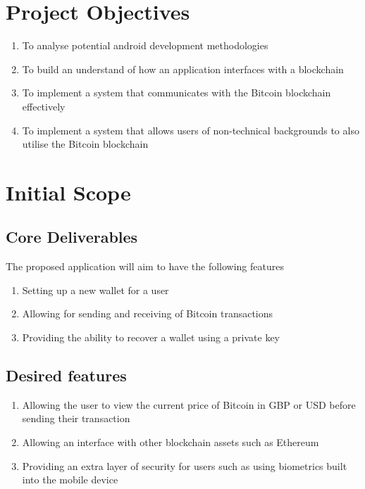 \documentclass[11pt]{article}
\begin{document}
\section{Project Objectives}
\label{sec:orgdfc5f8e}
\begin{enumerate}
\item To analyse potential android development methodologies
\label{sec:org39cbb94}
\item To build an understand of how an application interfaces with a blockchain
\label{sec:orgda3857f}
\item To implement a system that communicates with the Bitcoin blockchain effectively
\label{sec:org17774ea}
\item To implement a system that allows users of non-technical backgrounds to also utilise the Bitcoin blockchain
\label{sec:org1acc9ed}
\end{enumerate}


\section{Initial Scope}
\label{sec:orgf0603ac}
\subsection{Core Deliverables}
\label{sec:org2fd96fb}
The proposed application will aim to have the following features
\begin{enumerate}
\item Setting up a new wallet for a user
\label{sec:orgb4e5ea8}
\item Allowing for sending and receiving of Bitcoin transactions
\label{sec:org7543029}
\item Providing the ability to recover a wallet using a private key
\label{sec:orgb5738ec}
\end{enumerate}
\subsection{Desired features}
\label{sec:orgd277aad}
\begin{enumerate}
\item Allowing the user to view the current price of Bitcoin in GBP or USD before sending their transaction
\label{sec:org4aed705}
\item Allowing an interface with other blockchain assets such as Ethereum
\label{sec:org2de98d3}
\item Providing an extra layer of security for users such as using biometrics built into the mobile device
\label{sec:orgc940774}
\end{enumerate}
\end{document}
